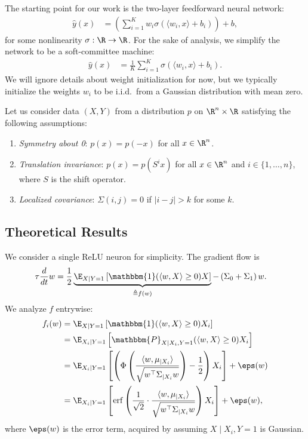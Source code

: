 The starting point for our work is the two-layer feedforward neural network:
\begin{align}
    \hat{y}(x) &= \left( \sum_{i=1}^K w_i \sigma\left(\langle w_i, x \rangle + b_i \right) \right) + b, \label{eq:two_layer_network}
\end{align}
for some nonlinearity $\sigma : \R \to \R$.
For the sake of analysis, we simplify the network to be a soft-committee machine:
\begin{align}
    \hat{y}(x) &= \frac{1}{K} \sum_{i=1}^K \sigma\left(\langle w_i, x \rangle + b_i \right). \label{eq:soft_committee_machine}
\end{align}
We will ignore details about weight initialization for now, but we typically initialize the weights $w_i$ to be i.i.d.\ from a Gaussian distribution with mean zero.

Let us consider data $(X, Y)$ from a distribution $p$ on $\R^n \times \R$ satisfying the following assumptions:
\begin{enumerate}
    \item \emph{Symmetry about 0}: $p(x) = p(-x)$ for all $x \in \R^n$.
    \item \emph{Translation invariance}: $p(x) = p(S^i x)$ for all $x \in \R^n$ and $i \in \{1, \ldots, n\}$, where $S$ is the shift operator.
    \item \emph{Localized covariance}: $\Sigma(i,j) = 0$ if $|i-j| > k$ for some $k$.
\end{enumerate}

\subsection{Theoretical Results}
We consider a single ReLU neuron for simplicity.
The gradient flow is
\begin{align}
    \tau \frac{d}{dt} w &= \frac{1}{2} \underbrace{\E_{X \mid Y=1} \left[ \mathbbm{1}(\langle w, X \rangle \geq 0) X \right]}_{\triangleq f(w)} - \left( \Sigma_0 + \Sigma_1 \right) w.
\end{align}
We analyze $f$ entrywise:
\begin{align}
    f_i(w) 
    &= \E_{X \mid Y=1} \left[ \mathbbm{1}(\langle w, X \rangle \geq 0) X_i \right] \\
    &= \E_{X_i \mid Y=1} \left[ \mathbbm{P}_{X \mid X_i, Y=1}(\langle w, X \rangle \geq 0) X_i \right] \\
    &= \E_{X_i \mid Y=1} \left[ \left( \Phi\left( \frac{\langle w, \mu_{\mid X_i} \rangle}{\sqrt{ w^\top \Sigma_{\mid X_i} w}} \right) - \frac{1}{2} \right) X_i \right] + \eps(w) \\
    &= \E_{X_i \mid Y=1} \left[ \operatorname{erf}\left( \frac{1}{\sqrt{2}} \cdot \frac{\langle w, \mu_{\mid X_i} \rangle}{\sqrt{ w^\top \Sigma_{\mid X_i} w}} \right) X_i \right] + \eps(w),
\end{align}
where $\eps(w)$ is the error term, acquired by assuming $X \mid X_i, Y=1$ is Gaussian.

